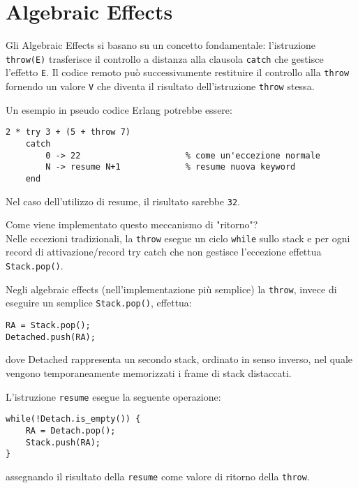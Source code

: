 \documentclass{article}
\begin{document}
\pagestyle{empty}

\section*{Algebraic Effects}
\large

Gli Algebraic Effects si basano su un concetto fondamentale: l'istruzione \texttt{throw(E)} trasferisce il controllo a distanza alla clausola \texttt{catch} che gestisce l'effetto \texttt{E}. Il codice remoto può successivamente restituire il controllo alla \texttt{throw} fornendo un valore \texttt{V} che diventa il risultato dell'istruzione \texttt{throw} stessa.

Un esempio in pseudo codice Erlang potrebbe essere:
\begin{tcolorbox}
\begin{verbatim}
2 * try 3 + (5 + throw 7)
    catch
        0 -> 22                     % come un'eccezione normale
        N -> resume N+1             % resume nuova keyword
    end
\end{verbatim}
\end{tcolorbox}
Nel caso dell'utilizzo di resume, il risultato sarebbe \texttt{32}.

Come viene implementato questo meccanismo di "ritorno"?\\
Nelle eccezioni tradizionali, la \texttt{throw} esegue un ciclo \texttt{while} sullo stack e per ogni record di attivazione/record try catch che non gestisce l'eccezione effettua \texttt{Stack.pop()}.

Negli algebraic effects (nell'implementazione più semplice) la \texttt{throw}, invece di eseguire un semplice \texttt{Stack.pop()}, effettua:
\begin{tcolorbox}
\begin{verbatim}
RA = Stack.pop();
Detached.push(RA);
\end{verbatim}
\end{tcolorbox}
dove Detached rappresenta un secondo stack, ordinato in senso inverso, nel quale vengono temporaneamente memorizzati i frame di stack distaccati.

L'istruzione \texttt{resume} esegue la seguente operazione:
\begin{tcolorbox}
\begin{verbatim}
while(!Detach.is_empty()) {
    RA = Detach.pop();
    Stack.push(RA);
}
\end{verbatim}
\end{tcolorbox}
assegnando il risultato della \texttt{resume} come valore di ritorno della \texttt{throw}.
\end{document}
